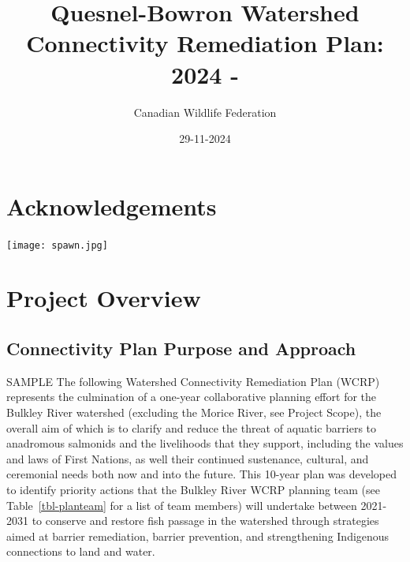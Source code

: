 \documentclass[
  letterpaper,
  DIV=11,
  numbers=noendperiod]{scrreprt}
\title{Quesnel-Bowron Watershed Connectivity Remediation Plan: 2024 -}
\author{Canadian Wildlife Federation}
\date{29-11-2024}
\renewcommand*\contentsname{Table of contents}
\newcommand\contentsname{Table of contents}
\begin{document}
\maketitle

\renewcommand*\contentsname{Table of contents}
{
\hypersetup{linkcolor=}
\setcounter{tocdepth}{1}
\tableofcontents
}


\chapter*{Acknowledgements}\label{acknowledgements}


\texttt{[image: spawn.jpg]}


\chapter*{Project Overview}\label{project-overview}


\section*{Connectivity Plan Purpose and
Approach}\label{connectivity-plan-purpose-and-approach}


SAMPLE The following Watershed Connectivity Remediation Plan (WCRP)
represents the culmination of a one-year collaborative planning effort
for the Bulkley River watershed (excluding the Morice River, see Project
Scope), the overall aim of which is to clarify and reduce the threat of
aquatic barriers to anadromous salmonids and the livelihoods that they
support, including the values and laws of First Nations, as well their
continued sustenance, cultural, and ceremonial needs both now and into
the future. This 10-year plan was developed to identify priority actions
that the Bulkley River WCRP planning team (see Table~\ref{tbl-planteam}
for a list of team members) will undertake between 2021-2031 to conserve
and restore fish passage in the watershed through strategies aimed at
barrier remediation, barrier prevention, and strengthening Indigenous
connections to land and water.
\end{document}
